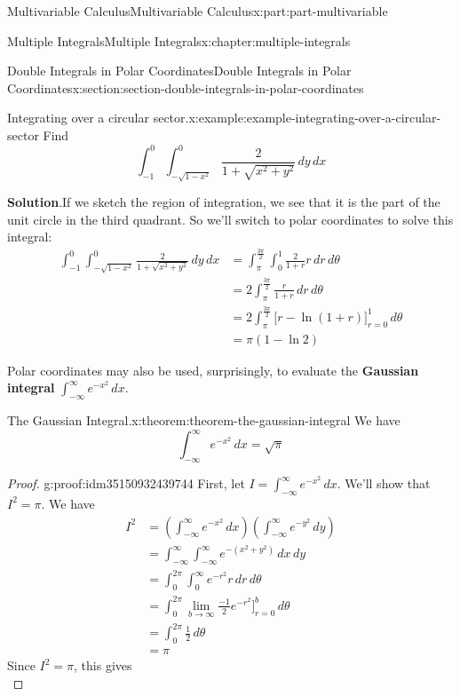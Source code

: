 \documentclass[twoside,10pt,]{book}
\newcommand{\blocktitlefont}{\relax}
\newcommand{\terminology}[1]{\textbf{#1}}
\numberwithin{equation}{part}
\begin{document}
\begin{partptx}{Multivariable Calculus}{}{Multivariable Calculus}{}{}{x:part:part-multivariable}
\begin{chapterptx}{Multiple Integrals}{}{Multiple Integrals}{}{}{x:chapter:multiple-integrals}
\begin{sectionptx}{Double Integrals in Polar Coordinates}{}{Double Integrals in Polar Coordinates}{}{}{x:section:section-double-integrals-in-polar-coordinates}
\begin{example}{Integrating over a circular sector.}{x:example:example-integrating-over-a-circular-sector}
Find%
\begin{equation*}
\int_{-1}^{0}\int_{-\sqrt{1-x^{2}}}^{0}\frac{2}{1+\sqrt{x^{2} + y^{2}}}\,dy\,dx
\end{equation*}
%
\par\smallskip%
\noindent\textbf{\blocktitlefont Solution}.\hypertarget{g:solution:idm35150932387136}{}\quad{}If we sketch the region of integration, we see that it is the part of the unit circle in the third quadrant. So we'll switch to polar coordinates to solve this integral:%
\begin{align*}
\int_{-1}^{0}\int_{-\sqrt{1-x^{2}}}^{0}\frac{2}{1+\sqrt{x^{2} + y^{2}}}\,dy\,dx & = \int_{\pi}^{\frac{3\pi}{2}}\int_{0}^{1}\frac{2}{1+r}r\,dr\,d\theta \\
& = 2\int_{\pi}^{\frac{3\pi}{2}} \frac{r}{1+r}\,dr\,d\theta \\
& = 2\int_{\pi}^{\frac{3\pi}{2}} \bigg[r - \ln(1+r)\bigg]_{r=0}^{1}\,d\theta \\
& = \pi(1-\ln2) 
\end{align*}
%
\end{example}
Polar coordinates may also be used, surprisingly, to evaluate the \terminology{Gaussian integral} \(\int_{-\infty}^{\infty}e^{-x^{2}}\,dx\).%
\begin{theorem}{The Gaussian Integral.}{}{x:theorem:theorem-the-gaussian-integral}%
We have%
\begin{equation*}
\int_{-\infty}^{\infty}e^{-x^{2}}\,dx = \sqrt{\pi}
\end{equation*}
%
\end{theorem}
\begin{proof}{}{g:proof:idm35150932439744}
First, let \(I = \int_{-\infty}^{\infty}e^{-x^{2}}\,dx\). We'll show that \(I^{2} = \pi\). We have%
\begin{align*}
I^{2} & = \left(\int_{-\infty}^{\infty}e^{-x^{2}}\,dx\right)\left(\int_{-\infty}^{\infty}e^{-y^{2}}\,dy\right) \\
& = \int_{-\infty}^{\infty}\int_{-\infty}^{\infty}e^{-(x^{2} + y^{2})}\,dx\,dy \\
& = \int_{0}^{2\pi}\int_{0}^{\infty}e^{-r^{2}}r\,dr\,d\theta \\
& = \int_{0}^{2\pi} \lim_{b\to\infty}\frac{-1}{2}e^{-r^{2}}\bigg]_{r=0}^{b}\,d\theta \\
& = \int_{0}^{2\pi} \frac{1}{2}\,d\theta \\
& = \pi 
\end{align*}
Since \(I^{2} = \pi\), this gives%
\begin{equation*}

\end{equation*}
\end{proof}
\end{sectionptx}
\end{chapterptx}
\end{partptx}
\end{document}
